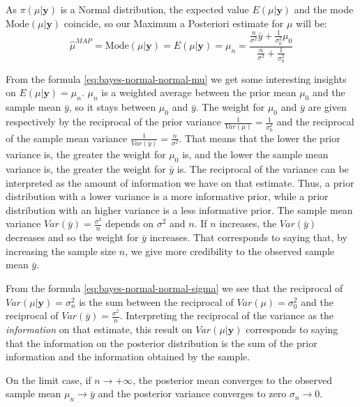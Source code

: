 \documentclass[a4paper, nobind]{templates/ociamthesis}
\theoremstyle{definition}
\theoremstyle{definition}
\theoremstyle{definition}
\theoremstyle{remark}
\begin{document}
As \(\pi(\mu|\boldsymbol{y})\) is a Normal distribution, the expected value \(E(\mu|\boldsymbol{y})\) and the mode \(\text{Mode}(\mu|\boldsymbol{y})\) coincide, so our Maximum a Posteriori estimate for \(\mu\) will be:
\[
\hat{\mu}^{MAP} = \text{Mode}(\mu|\boldsymbol{y}) = E(\mu|\boldsymbol{y}) = \mu_n = \frac{\frac{n}{\sigma^2}\bar{y} + \frac{1}{\sigma_0^2}\mu_0}{ \frac{n}{\sigma^2} + \frac{1}{\sigma_0^2}}
\]

From the formula \eqref{eq:bayes-normal-normal-mu} we get some interesting insights on \(E(\mu|\boldsymbol{y})=\mu_n\). \(\mu_n\) is a weighted average between the prior mean \(\mu_0\) and the sample mean \(\bar{y}\), so it stays between \(\mu_0\) and \(\bar{y}\). The weight for \(\mu_0\) and \(\bar{y}\) are given respectively by the reciprocal of the prior variance \(\frac{1}{Var(\mu)}=\frac{1}{\sigma_0^2}\) and the reciprocal of the sample mean variance \(\frac{1}{Var(\bar{y})}=\frac{n}{\sigma^2}\). That means that the lower the prior variance is, the greater the weight for \(\mu_0\) is, and the lower the sample mean variance is, the greater the weight for \(\bar{y}\) is. The reciprocal of the variance can be interpreted as the amount of information we have on that estimate. Thus, a prior distribution with a lower variance is a more informative prior, while a prior distribution with an higher variance is a less informative prior. The sample mean variance \(Var(\bar{y})=\frac{\sigma^2}{n}\) depends on \(\sigma^2\) and \(n\). If \(n\) increases, the \(Var(\bar{y})\) decreases and so the weight for \(\bar{y}\) increases. That corresponds to saying that, by increasing the sample size \(n\), we give more credibility to the observed sample mean \(\bar{y}\).

From the formula \eqref{eq:bayes-normal-normal-sigma} we see that the reciprocal of \(Var(\mu|\boldsymbol{y})=\sigma_n^2\) is the sum between the reciprocal of \(Var(\mu)=\sigma_0^2\) and the reciprocal of \(Var(\bar{y})=\frac{\sigma^2}{n}\). Interpreting the reciprocal of the variance as the \emph{information} on that estimate, this result on \(Var(\mu|\boldsymbol{y})\) corresponds to saying that the information on the posterior distribution is the sum of the prior information and the information obtained by the sample.

On the limit case, if \(n\to +\infty\), the posterior mean converges to the observed sample mean \(\mu_n\to \bar{y}\) and the posterior variance converges to zero \(\sigma_n\to 0\).
\end{document}

